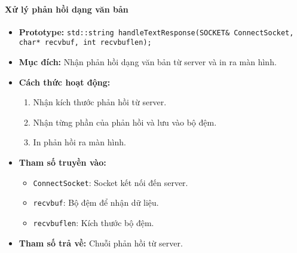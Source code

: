 \paragraph{\textbf{Xử lý phản hồi dạng văn bản}}
\begin{itemize}
    \item \textbf{Prototype:} \texttt{std::string handleTextResponse(SOCKET\& ConnectSocket, char* recvbuf, int recvbuflen);}
    
    \item \textbf{Mục đích:} Nhận phản hồi dạng văn bản từ server và in ra màn hình.
    
    \item \textbf{Cách thức hoạt động:} 
    \begin{enumerate}
        \item Nhận kích thước phản hồi từ server.
        \item Nhận từng phần của phản hồi và lưu vào bộ đệm.
        \item In phản hồi ra màn hình.
    \end{enumerate}
    
    \item \textbf{Tham số truyền vào:} 
    \begin{itemize}
        \item \texttt{ConnectSocket}: Socket kết nối đến server.
        \item \texttt{recvbuf}: Bộ đệm để nhận dữ liệu.
        \item \texttt{recvbuflen}: Kích thước bộ đệm.
    \end{itemize}
    
    \item \textbf{Tham số trả về:} Chuỗi phản hồi từ server.
\end{itemize}

